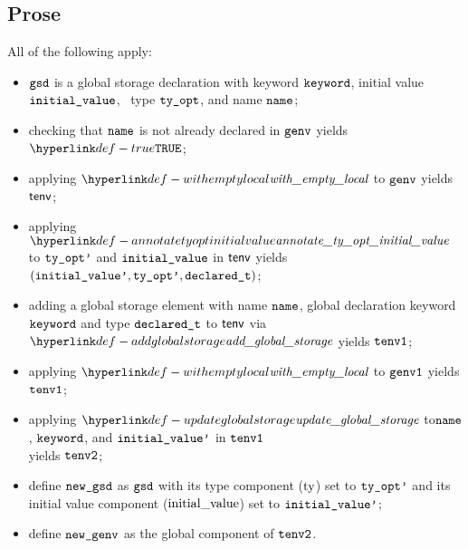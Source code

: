 \subsection{Prose}
All of the following apply:
\begin{itemize}
  \item $\texttt{gsd}$ is a global storage declaration with keyword $\texttt{keyword}$, initial value \\ $\texttt{initial\_value}$,
        \optional\ type $\texttt{ty\_opt}$, and name $\texttt{name}$;
  \item checking that $\texttt{name}$ is not already declared in $\texttt{genv}$ yields $\True$\ProseOrTypeError;
  \item applying $\withemptylocal$ to $\texttt{genv}$ yields $\textsf{tenv}$;
  \item applying $\annotatetyoptinitialvalue$ to $\texttt{ty\_opt'}$ and $\texttt{initial\_value}$ in $\textsf{tenv}$ yields
        $(\texttt{initial\_value'}, \texttt{ty\_opt'}, \texttt{declared\_t})$\ProseOrTypeError;
  \item adding a global storage element with name $\texttt{name}$, global declaration keyword \\ $\texttt{keyword}$ and type $\texttt{declared\_t}$
        to $\textsf{tenv}$ via $\addglobalstorage$ yields $\texttt{tenv1}$\ProseOrTypeError;
  \item applying $\withemptylocal$ to $\texttt{genv1}$ yields $\texttt{tenv1}$;
  \item applying $\updateglobalstorage$ to$\texttt{name}$, $\texttt{keyword}$, and $\texttt{initial\_value'}$ in $\texttt{tenv1}$ \\
        yields $\texttt{tenv2}$\ProseOrTypeError;
  \item define $\texttt{new\_gsd}$ as $\texttt{gsd}$ with its type component ($\text{ty}$) set to $\texttt{ty\_opt'}$ and its initial value component
        ($\text{initial\_value}$) set to $\texttt{initial\_value'}$;
  \item define $\texttt{new\_genv}$ as the global component of $\texttt{tenv2}$.
\end{itemize}
